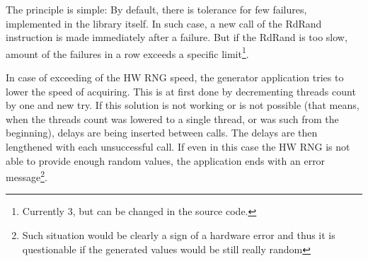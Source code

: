 \par{
The principle is simple: By default, there is tolerance for few failures, implemented in the library itself. In such case, a new call of the RdRand instruction is made immediately after a failure. But if the RdRand is too slow, amount of the failures in a row exceeds a specific limit\footnote{Currently 3, but can be changed in the source code.}. 
}

\par{
In case of exceeding of the HW RNG speed, the generator application tries to lower the speed of acquiring. This is at first done by decrementing threads count by one and new try. If this solution is not working or is not possible (that means, when the threads count was lowered to a single thread, or was such from the beginning), delays are being inserted between calls. The delays are then lengthened with each unsuccessful call. If even in this case the HW RNG is not able to provide enough random values, the application ends with an error message\footnote{Such situation would be clearly a sign of a hardware error and thus it is questionable if the generated values would be still really random}.
}
